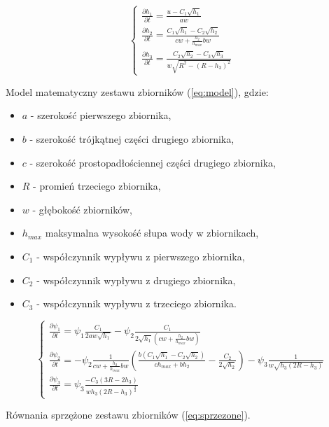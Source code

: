 \documentclass[12p]{article}
\begin{document}
	\begin{equation}\label{eq:model}
		\left \{
		\begin{array}{lr}
			\frac{\partial h_{1}}{\partial t} = \frac{u - C_{1}\sqrt{h_{1}}}{aw} \\[8pt]
			\frac{\partial h_{2}}{\partial t} = \frac{C_{1}\sqrt{h_{1}} -  C_{2}\sqrt{h_{2}}}{cw + \frac{h_{2}}{h_{max}}bw} \\[20pt]
			\frac{\partial h_{3}}{\partial t} = \frac{C_{2}\sqrt{h_{2}} -  C_{3}\sqrt{h_{3}}}{w\sqrt{R^{2} - (R - h_{3})^{2}}}
		\end{array}
		\right.
	\end{equation}
	
	Model matematyczny zestawu zbiorników (\ref{eq:model}), gdzie:
	\begin{itemize}
		\item $a$ - szerokość pierwszego zbiornika,
		\item $b$ - szerokość trójkątnej części drugiego zbiornika,
		\item $c$ - szerokość prostopadłościennej części drugiego zbiornika,
		\item $R$ - promień trzeciego zbiornika,
		\item $w$ - głębokość zbiorników,
		\item $h_{max}$ maksymalna wysokość słupa wody w zbiornikach,
		\item $C_{1}$ - współczynnik wypływu z pierwszego zbiornika,
		\item $C_{2}$ - współczynnik wypływu z drugiego zbiornika,
		\item $C_{3}$ - współczynnik wypływu z trzeciego zbiornika.
	\end{itemize}

	\begin{equation}\label{eq:sprzezone}
		\left \{
		\begin{array}{lr}
			\frac{\partial \psi_{1}}{\partial t} =  \psi_{1}\frac{C_{1}}{2aw\sqrt{h_{1}}} - \psi_{2}\frac{C_{1}}{2\sqrt{h_{1}}(cw + \frac{h_{2}}{h_{max}}bw)} \\[20pt]
			\frac{\partial \psi_{2}}{\partial t} = - \psi_{2}\frac{1}{cw + \frac{h_{2}}{h_{max}}bw}(\frac{b(C_{1}\sqrt{h_{1}} - C_{2}\sqrt{h_{2}})}{ch_{max} + bh_{2}} - \frac{C_{2}}{2\sqrt{h_{2}}}) - \psi_{3}\frac{1}{w\sqrt{h_{3}(2R - h_{3})}} \\[20pt]
			\frac{\partial \psi_{3}}{\partial t} = \psi_{3}\frac{-C_{3}(3R - 2h_{3})}{wh_{3}(2R - h_{3})^{\frac{3}{2}}}
		\end{array}
		\right.
	\end{equation}
	
	Równania sprzężone zestawu zbiorników (\ref{eq:sprzezone}).
\end{document}
